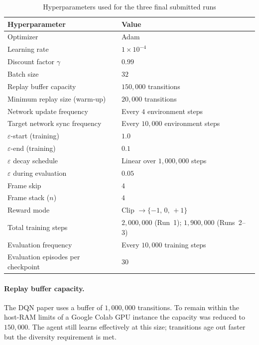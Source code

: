 \documentclass[11pt,a4paper]{article}
\begin{document}
\begin{table}[H]
\centering
\caption{Hyperparameters used for the three final submitted runs}
\begin{tabular}{ll}
\toprule
Hyperparameter                        & Value \\
\midrule
Optimizer                             & Adam \\
Learning rate                         & $1\times10^{-4}$ \\
Discount factor $\gamma$              & $0.99$ \\
Batch size                            & $32$ \\
Replay buffer capacity                & $150{,}000$ transitions \\
Minimum replay size (warm-up)         & $20{,}000$ transitions \\
Network update frequency              & Every $4$ environment steps \\
Target network sync frequency         & Every $10{,}000$ environment steps \\
$\varepsilon$-start (training)        & $1.0$ \\
$\varepsilon$-end (training)          & $0.1$ \\
$\varepsilon$ decay schedule          & Linear over $1{,}000{,}000$ steps \\
$\varepsilon$ during evaluation       & $0.05$ \\
Frame skip                            & $4$ \\
Frame stack ($n$)                     & $4$ \\
Reward mode                           & Clip $\rightarrow \{-1,\,0,\,+1\}$ \\
Total training steps                  & $2{,}000{,}000$ (Run~1); $1{,}900{,}000$ (Runs~2--3) \\
Evaluation frequency                  & Every $10{,}000$ training steps \\
Evaluation episodes per checkpoint    & $30$ \\
\bottomrule
\end{tabular}
\end{table}

\paragraph{Replay buffer capacity.}
The DQN paper uses a buffer of $1{,}000{,}000$ transitions.
To remain within the host-RAM limits of a Google Colab GPU instance the
capacity was reduced to $150{,}000$.
The agent still learns effectively at this size; transitions age out faster
but the diversity requirement is met.
\end{document}
